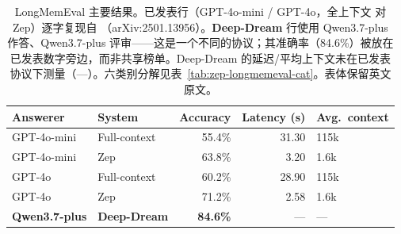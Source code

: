 \begin{table}[t]
\centering
\caption{LongMemEval 主要结果。已发表行（GPT-4o-mini / GPT-4o，全上下文 对 Zep）逐字复现自 \citet{rasmussen2025zep}（arXiv:2501.13956）。\textbf{Deep-Dream} 行使用 Qwen3.7-plus 作答、Qwen3.7-plus 评审——这是一个不同的协议；其准确率（84.6\%）被放在已发表数字旁边，而非共享榜单。Deep-Dream 的延迟/平均上下文未在已发表协议下测量（---）。六类别分解见表~\ref{tab:zep-longmemeval-cat}。表体保留英文原文。}
\label{tab:zep-longmemeval}
\footnotesize
\begin{tabular}{llrrl}
\toprule
Answerer & System & Accuracy & Latency (s) & Avg.\ context \\
\midrule
GPT-4o-mini & Full-context & 55.4\% & 31.30 & 115k \\
GPT-4o-mini & Zep & 63.8\% & 3.20 & 1.6k \\
GPT-4o & Full-context & 60.2\% & 28.90 & 115k \\
GPT-4o & Zep & 71.2\% & 2.58 & 1.6k \\
\textbf{Qwen3.7-plus} & \textbf{Deep-Dream} & \textbf{84.6\%} & --- & --- \\
\bottomrule
\end{tabular}
\end{table}

